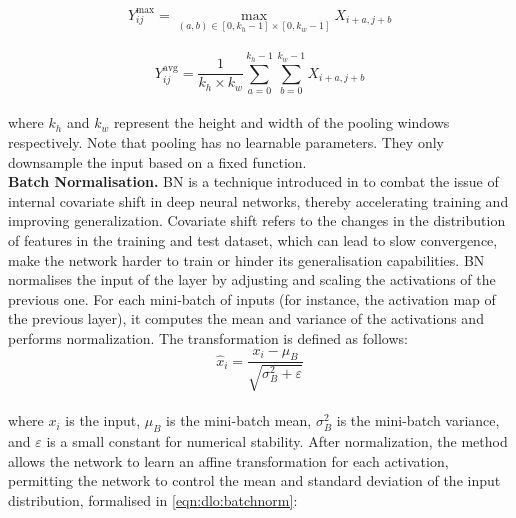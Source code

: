 
\begin{equation}
  \label{eqn:dlo:max_pooling}
  Y^{\text{max}}_{ij} = \max_{(a,b) \in [0, k_h-1] \times [0, k_w-1]} X_{i + a, j + b}
\end{equation}\\
  
  \begin{equation}
  \label{eqn:dlo:avg_pooling}
  Y^{\text{avg}}_{ij} = \frac{1}{k_h \times k_w} \sum_{a=0}^{k_h-1} \sum_{b=0}^{k_w-1} X_{i + a, j + b}  
\end{equation}\\

\noindent where $k_h$ and $k_w$ represent the height and width of the pooling
windows respectively. Note that pooling has no learnable parameters. They only
downsample the input based on a fixed function.\\


\noindent \textbf{Batch Normalisation.} \ac{BN} is a technique introduced in
\cite{DBLP:conf/icml/IoffeS15} to combat the issue of internal covariate shift
in deep neural networks, thereby accelerating training and improving
generalization. Covariate shift refers to the changes in the distribution of
features in the training and test dataset, which can lead to slow convergence,
make the network harder to train or hinder its generalisation capabilities.
\ac{BN} normalises the input of the layer by adjusting and scaling the
activations of the previous one. For each mini-batch of inputs (for instance,
the activation map of the previous layer), it computes the mean and variance of
the activations and performs normalization. The transformation is defined as
follows:\\

\begin{equation}
  \label{eqn:dlo:batchnorm}
  \hat{x}_{i} = \frac{x_{i} - \mu_{B}}{\sqrt{\sigma_{B}^{2} + \varepsilon}}
\end{equation}\\

\noindent where $x_{i}$ is the input, $\mu_{B}$ is the mini-batch mean,
$\sigma_{B}^{2}$ is the mini-batch variance, and $\varepsilon$ is a small
constant for numerical stability. After normalization, the method allows the
network to learn an affine transformation for each activation, permitting the
network to control the mean and standard deviation of the input distribution,
formalised in \cref{eqn:dlo:batchnorm}:\\


